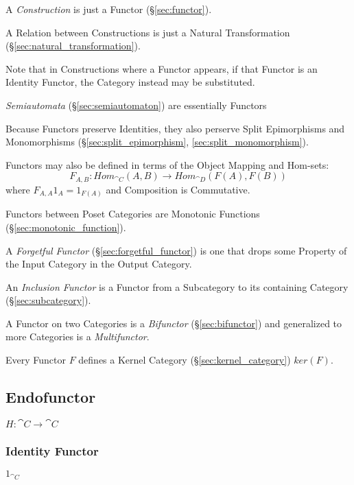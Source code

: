 A \emph{Construction} is just a Functor (\S\ref{sec:functor}).

A Relation between Constructions is just a Natural Transformation
(\S\ref{sec:natural_transformation}).

\fist Note that in Constructions where a Functor appears, if
that Functor is an Identity Functor, the Category instead may be
substituted.

\fist \emph{Semiautomata} (\S\ref{sec:semiautomaton}) are essentially
Functors

Because Functors preserve Identities, they also perserve Split
Epimorphisms and Monomorphisms (\S\ref{sec:split_epimorphism},
\ref{sec:split_monomorphism}).

Functors may also be defined in terms of the Object Mapping and
Hom-sets:
\[
  F_{A,B} : Hom_{\cat{C}}(A,B) \rightarrow Hom_{\cat{D}}(F(A),F(B))
\]
where $F_{A,A}1_A = 1_{F(A)}$ and Composition is Commutative.

Functors between Poset Categories are Monotonic Functions
(\S\ref{sec:monotonic_function}).

A \emph{Forgetful Functor} (\S\ref{sec:forgetful_functor}) is one that
drops some Property of the Input Category in the Output Category.

An \emph{Inclusion Functor} is a Functor from a Subcategory to its
containing Category (\S\ref{sec:subcategory}).

A Functor on two Categories is a \emph{Bifunctor}
(\S\ref{sec:bifunctor}) and generalized to more Categories is a
\emph{Multifunctor}.

Every Functor $F$ defines a Kernel Category
(\S\ref{sec:kernel_category}) $ker(F)$.



\subsection{Endofunctor}\label{sec:endofunctor}

$H : \cat{C} \rightarrow \cat{C}$



\subsubsection{Identity Functor}\label{sec:identity_functor}

$1_{\cat{C}}$



